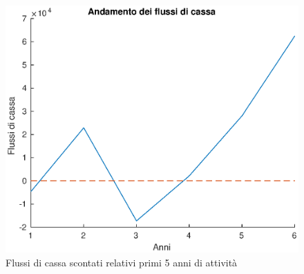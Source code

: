 
%
\begin{figure}[!h]
\centering
\includegraphics[width=\textwidth]{figures/cf}
\caption{Flussi di cassa scontati relativi primi 5 anni di attività}
\label{cf}
\end{figure}
%
